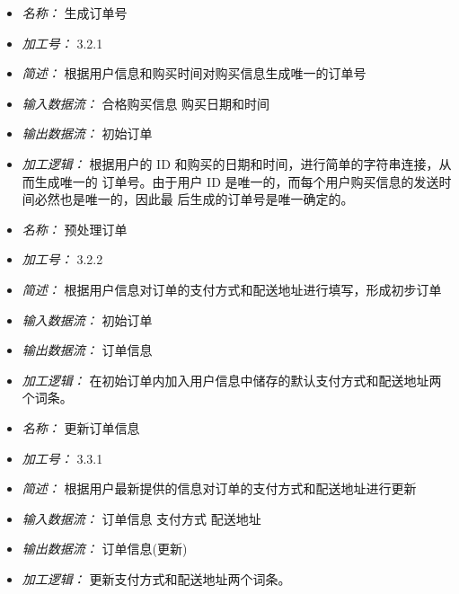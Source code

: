 \begin{itemize}
\item \textit{名称： }生成订单号
\item \textit{加工号： }3.2.1
\item \textit{简述： }根据用户信息和购买时间对购买信息生成唯一的订单号
\item \textit{输入数据流： }合格购买信息 购买日期和时间
\item \textit{输出数据流： }初始订单
\item \textit{加工逻辑： }根据用户的 ID 和购买的日期和时间，进行简单的字符串连接，从而生成唯一的 订单号。由于用户 ID 是唯一的，而每个用户购买信息的发送时间必然也是唯一的，因此最 后生成的订单号是唯一确定的。

\end{itemize}


\vspace{-1mm}


\begin{itemize}
\item \textit{名称： }预处理订单
\item \textit{加工号： }3.2.2 
\item \textit{简述： }根据用户信息对订单的支付方式和配送地址进行填写，形成初步订单 
\item \textit{输入数据流： }初始订单
\item \textit{输出数据流： }订单信息 
\item \textit{加工逻辑： }在初始订单内加入用户信息中储存的默认支付方式和配送地址两个词条。

\end{itemize}


\vspace{-1mm}


\begin{itemize}
\item \textit{名称： }更新订单信息
\item \textit{加工号： }3.3.1 
\item \textit{简述： }根据用户最新提供的信息对订单的支付方式和配送地址进行更新 
\item \textit{输入数据流： }订单信息 支付方式 配送地址 
\item \textit{输出数据流： }订单信息(更新) 
\item \textit{加工逻辑： }更新支付方式和配送地址两个词条。

\end{itemize}


\vspace{-1mm}


